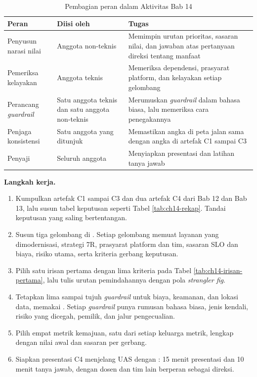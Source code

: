 \begin{table}[!htb]
  \centering
  \caption{Pembagian peran dalam Aktivitas Bab 14}
  \label{tab:ch14-peran}
  \footnotesize
  \begin{tabularx}{\textwidth}{>{\raggedright\arraybackslash}p{2.8cm}
      >{\raggedright\arraybackslash}p{3.0cm} >{\raggedright\arraybackslash}X}
    \hline
    \textbf{Peran} & \textbf{Diisi oleh} & \textbf{Tugas} \\ \hline
    Penyusun narasi nilai & Anggota non-teknis & Memimpin urutan prioritas, sasaran nilai, dan
      jawaban atas pertanyaan direksi tentang manfaat \\ \hline
    Pemeriksa kelayakan & Anggota teknis & Memeriksa dependensi, prasyarat platform, dan
      kelayakan setiap gelombang \\ \hline
    Perancang \textit{guardrail} & Satu anggota teknis dan satu anggota non-teknis & Merumuskan
      \textit{guardrail} dalam bahasa biasa, lalu memeriksa cara penegakannya \\ \hline
    Penjaga konsistensi & Satu anggota yang ditunjuk & Memastikan angka di peta jalan sama dengan
      angka di artefak C1 sampai C3 \\ \hline
    Penyaji & Seluruh anggota & Menyiapkan presentasi dan latihan tanya jawab \\ \hline
  \end{tabularx}
\end{table}

\textbf{Langkah kerja.}
\begin{enumerate}
  \item Kumpulkan artefak C1 sampai C3 dan dua artefak C4 dari Bab 12 dan Bab 13, lalu susun tabel
        keputusan seperti Tabel \ref{tab:ch14-rekap}. Tandai keputusan yang saling bertentangan.
  \item Susun tiga gelombang di
        . Setiap gelombang memuat
        layanan yang dimodernisasi, strategi 7R, prasyarat platform dan tim, sasaran SLO dan biaya,
        risiko utama, serta kriteria gerbang keputusan.
  \item Pilih satu irisan pertama dengan lima kriteria pada Tabel \ref{tab:ch14-irisan-pertama},
        lalu tulis urutan pemindahannya dengan pola \textit{strangler fig}.
  \item Tetapkan lima sampai tujuh \textit{guardrail} untuk biaya, keamanan, dan lokasi data,
        memakai . Setiap \textit{guardrail} punya
        rumusan bahasa biasa, jenis kendali, risiko yang dicegah, pemilik, dan jalur pengecualian.
  \item Pilih empat metrik kemajuan, satu dari setiap keluarga metrik, lengkap dengan nilai awal
        dan sasaran per gerbang.
  \item Siapkan presentasi C4 menjelang UAS dengan
        : 15 menit presentasi dan 10 menit tanya
        jawab, dengan dosen dan tim lain berperan sebagai direksi.
\end{enumerate}

